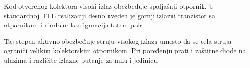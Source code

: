 Kod otvorenog kolektora visoki izlaz obezbeđuje spoljašnji otpornik. U standardnoj TTL realizaciji desno uveden je gornji izlazni tranzistor sa otpornikom i diodom: konfiguracija totem pole.

Taj stepen aktivno obezbeđuje struju visokog izlaza umesto da se cela struja ograniči velikim kolektorskim otpornikom. Pri poređenju prati i zaštitne diode na ulazima i različite izlazne putanje za nulu i jedinicu.
